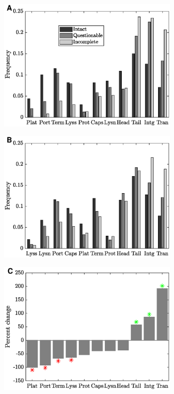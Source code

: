 \begin{figure}
    \centering
    \begin{subfigure}[t]{0.50\textwidth}
    \includegraphics[scale=0.50]{bobay1}
     \end{subfigure}\hfill
     \begin{subfigure}[t]{0.50\textwidth} 
    \includegraphics[scale=0.50]{aclame1}
    \end{subfigure}\hfill
         \begin{subfigure}[t]{0.50\textwidth}
    \includegraphics[scale=0.50]{bobay2}

\end{subfigure}
\end{figure}
